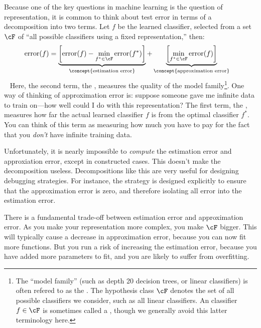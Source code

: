 Because one of the key questions in machine learning is the question of representation, it is common to think about test error in terms of a decomposition into two terms. Let $f$ be the learned classifier, selected from a set $\cF$ of ``all possible classifiers using a fixed representation,'' then:
~
\begin{align}
\text{error}(f)
&= 
\underbrace{\left[ \text{error}(f) - \min_{f^* \in \cF} \text{error}(f^*) \right]}_{\text{\concept{estimation error}}}
+
\underbrace{\left[ \min_{f^* \in \cF} \text{error}(f) \right]}_{\text{\concept{approximation error}}}
\end{align}
~
Here, the second term, the , measures the quality of the model family\footnote{The ``model family'' (such as depth 20 decision trees, or linear classifiers) is often refered to as the . The hypothesis class $\cF$ denotes the set of all possible classifiers we consider, such as all linear classifiers. An classifier $f \in \cF$ is sometimes called a , though we generally avoid this latter terminology here.}. One way of thinking of approximation error is: suppose someone gave me infinite data to train on---how well could I do with this representation?
The first term, the , measures how far the actual learned classifier $f$ is from the optimal classifier $f^*$. You can think of this term as measuring how much you have to pay for the fact that you \emph{don't} have infinite training data.

Unfortunately, it is nearly impossible to \emph{compute} the estimation error and approxiation error, except in constructed cases.
This doesn't make the decomposition useless.
Decompositions like this are very useful for designing debugging strategies.
For instance, the  strategy is designed explicitly to ensure that the approximation error is zero, and therefore isolating all error into the estimation error.

There is a fundamental trade-off between estimation error and approximation error.
As you make your representation more complex, you make $\cF$ bigger.
This will typically cause a decrease in approximation error, because you can now fit more functions.
But you run a risk of increasing the estimation error, because you have added more parameters to fit, and you are likely to suffer from overfitting.

